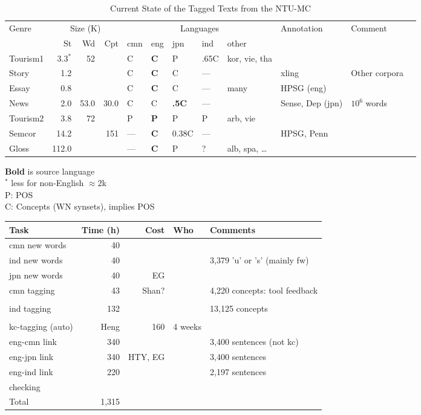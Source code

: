 \documentclass[12pt]{book} %
\begin{document}
\begin{CJK}{UTF8}{gbsn}
\begin{table}[tb]
  \centering
  \begin{tabular}{lrrrllllllll}
    Genre & \multicolumn{3}{c}{Size (K)}        & \multicolumn{5}{c}{Languages} & Annotation & Comment \\
          & St & Wd & Cpt &  cmn & eng & jpn & ind & other\\
\hline
    Tourism1 & 3.3$^*$ & 52 & & C &  \textbf{C} & P  & .65C & kor, vie, tha 
    &   & \\
    Story    & 1.2 & & & C &  \textbf{C} & C & --- &  
    & xling  & Other corpora \\
    Essay    & 0.8& & & C & \textbf{C} & C & --- & many 
    & HPSG (eng) \\
    News     & 2.0 & 53.0 & 30.0 & C & C & \textbf{.5C}  & --- &
    & Sense, Dep (jpn) & $10^6$ words\\
    \hline
    Tourism2 & 3.8 & 72  & & P & \textbf{P} & P & P & arb, vie\\
    Semcor & 14.2 &  & 151 & --- & \textbf{C} & 0.38C & ---& & HPSG, Penn\\ %
    Gloss  & 112.0 & & &  --- & \textbf{C} & P & ? & alb, spa, \ldots\\
  \end{tabular}
  \caption{Current State of the Tagged Texts from the NTU-MC}
  \label{tab:ntu-mc-now}
  \begin{flushleft} \small
    \textbf{Bold} is source language
    \\ $^*$ less for non-English $\approx 2$k
    \\ P: POS 
    \\ C: Concepts (WN synsets), implies POS 
  \end{flushleft}
\end{table}




\begin{tabular}{lrrll}
  Task & Time (h) & Cost & Who & Comments \\ \hline
  cmn new words & 40 &  &     & \\
  ind new words & 40 &  &     & 3,379 'u' or 's' (mainly fw)\\
  jpn new words & 40 & EG & \\
  cmn tagging & 43  & Shan? &     & 4,220 concepts: tool feedback\\\\
  ind tagging & 132 &  &     & 13,125 concepts\\\\
  kc-tagging (auto) & Heng & 160 &  4 weeks \\
  eng-cmn link & 340 &  & & 3,400 sentences (not kc)\\
  eng-jpn link & 340& HTY, EG & & 3,400 sentences\\
  eng-ind link & 220 &  & & 2,197 sentences\\
  checking & \\
\hline
Total & 1,315 \\


\end{tabular}
\end{CJK}
\end{document}
